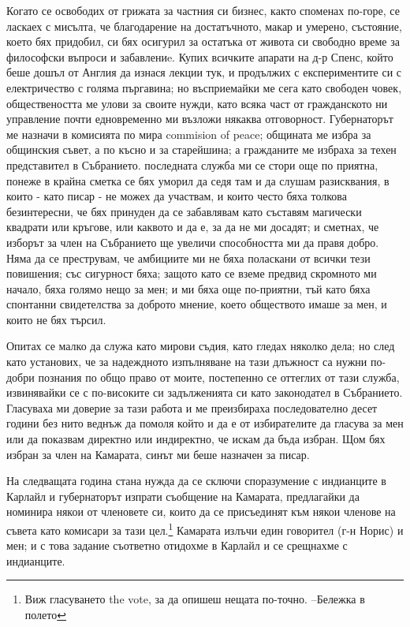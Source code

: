 \documentclass[12pt]{book}
\begin{document}
Когато се освободих от грижата за частния си бизнес, както споменах по-горе, се ласкаех с мисълта, че благодарение на достатъчното, макар и умерено, състояние, което бях придобил, си бях осигурил за остатъка от живота си свободно време за философски въпроси и забавлениe. Купих всичките апарати на д-р Спенс, който беше дошъл от Англия да изнася лекции тук, и продължих с експериментите си с електричество с голяма пъргавина; но въсприемайки ме сега като свободен човек, обществеността ме улови за своите нужди, като всяка част от гражданското ни управление почти едновременно ми възложи някаква отговорност. Губернаторът ме назначи в комисията по мира commision of peace; общината ме избра за общинския съвет, а по късно и за старейшина; а гражданите ме избраха за техен представител в Събранието. последната служба ми се стори още по приятна, понеже в крайна сметка се бях уморил да седя там и да слушам разисквания, в които - като писар - не можех да участвам, и които често бяха толкова безинтересни, че бях принуден да се забавлявам като съставям магически квадрати или кръгове, или каквото и да е, за да не ми досадят; и сметнах, че изборът за член на Събранието ще увеличи способността ми да правя добро. Няма да се преструвам, че амбициите ми не бяха поласкани от всички тези повишения; със сигурност бяха; защото като се вземе предвид скромното ми начало, бяха голямо нещо за мен; и ми бяха още по-приятни, тъй като бяха спонтанни свидетелства за доброто мнение, което обществото имаше за мен, и които не бях търсил.

Опитах се малко да служа като мирови съдия, като гледах няколко дела; но след като установих, че за надеждното изпълняване на тази длъжност са нужни по-добри познания по общо право от моите, постепенно се оттеглих от тази служба, извинявайки се с по-високите си задълженията си като законодател в Събранието. Гласуваха ми доверие за тази работа и ме преизбираха последователно десет години без нито веднъж да помоля който и да е от избирателите да гласува за мен или да показвам директно или индиректно, че искам да бъда избран. Щом бях избран за член на Камарата, синът ми беше назначен за писар. 

На следващата година стана нужда да се сключи споразумение с индианците в Карлайл и губернаторът изпрати съобщение на Камарата, предлагайки да номинира някои от членовете си, които да се присъединят към някои членове на съвета като комисари за тази цел.\footnote{ Виж гласуването the vote, за да опишеш нещата по-точно. --Бележка в полето} Камарата излъчи един говорител (г-н Норис) и мен; и с това задание съответно отидохме в Карлайл и се срещнахме с индианците. 
\end{document}

